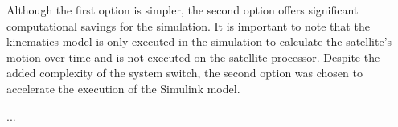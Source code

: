 Although the first option is simpler, the second option offers significant computational savings for the simulation. It is important to note that the kinematics model is only executed in the simulation to calculate the satellite's motion over time and is not executed on the satellite processor. Despite the added complexity of the system switch, the second option was chosen to accelerate the execution of the Simulink model.

...
